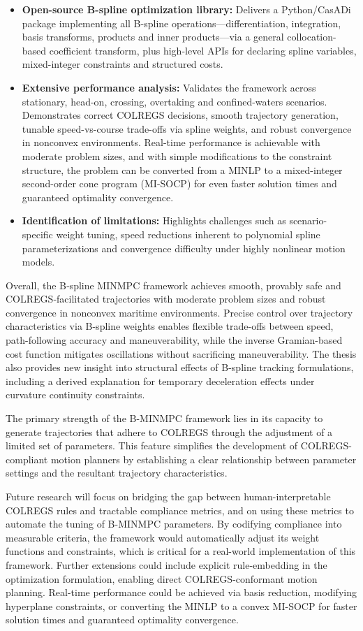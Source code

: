 \begin{itemize}
    \item \textbf{Open-source B-spline optimization library:}  Delivers a Python/CasADi package implementing all B-spline operations---differentiation, integration, basis transforms, products and inner products---via a general collocation-based coefficient transform, plus high-level APIs for declaring spline variables, mixed-integer constraints and structured costs.

    \item \textbf{Extensive performance analysis:}  Validates the framework across stationary, head-on, crossing, overtaking and confined-waters scenarios. Demonstrates correct COLREGS decisions, smooth trajectory generation, tunable speed-vs-course trade-offs via spline weights, and robust convergence in nonconvex environments. Real-time performance is achievable with moderate problem sizes, and with simple modifications to the constraint structure, the problem can be converted from a MINLP to a mixed-integer second-order cone program (MI-SOCP) for even faster solution times and guaranteed optimality convergence.

    \item \textbf{Identification of limitations:}  Highlights challenges such as scenario-specific weight tuning, speed reductions inherent to polynomial spline parameterizations and convergence difficulty under highly nonlinear motion models. 
\end{itemize}


Overall, the B‐spline MINMPC framework achieves smooth, provably safe and COLREGS‐facilitated trajectories with moderate problem sizes and robust convergence in nonconvex maritime environments. Precise control over trajectory characteristics via B-spline weights enables flexible trade-offs between speed, path-following accuracy and maneuverability, while the inverse Gramian-based cost function mitigates oscillations without sacrificing maneuverability. 
The thesis also provides new insight into structural effects of B-spline tracking formulations, including a derived explanation for temporary deceleration effects under curvature continuity 
constraints.

The primary strength of the B-MINMPC framework lies in its capacity to generate trajectories that adhere to COLREGS through the adjustment of a limited set of parameters. This feature simplifies the development of COLREGS-compliant motion planners by establishing a clear relationship between parameter settings and the resultant trajectory characteristics. 

Future research will focus on bridging the gap between human-interpretable COLREGS rules and tractable compliance metrics, and on using these metrics to automate the tuning of B-MINMPC parameters. By codifying compliance into measurable criteria, the framework would automatically adjust its weight functions and constraints, which is critical for a real-world implementation of this framework.
Further extensions could include explicit rule-embedding in the optimization formulation, enabling direct COLREGS-conformant motion planning. Real-time performance could be achieved via basis reduction, modifying hyperplane constraints, or converting the MINLP to a convex MI-SOCP for faster solution times and guaranteed optimality convergence.